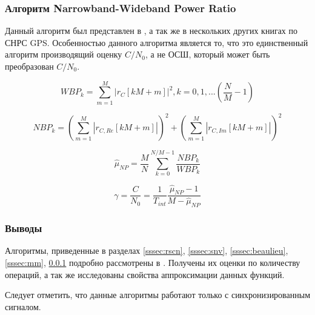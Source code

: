 \subsubsection{Алгоритм Narrowband-Wideband Power Ratio}
\label{sssec:nwpr}

Данный алгоритм был представлен в \cite{parkinson_1996}, а так же в нескольких других книгах по СНРС GPS. Особенностью данного алгоритма
является то, что это единственный алгоритм производящий оценку ${C/N_0}$, а не ОСШ, который может быть преобразован ${C/N_0}$.

\begin{center}
\begin{equation}
	WBP_k = \sum \limits_{m=1}^{M} \left|r_C[kM+m] \right| ^2, k=0,1,...(\frac{N}{M}-1)
\end{equation}
\end{center}

\begin{center}
\begin{equation}
	NBP_k = (\sum \limits_{m=1}^{M} \left|r_{C,Re}[kM+m] \right| )^2 + (\sum \limits_{m=1}^{M} \left|r_{C,Im}[kM+m] \right| )^2
\end{equation}
\end{center}

\begin{center}
\begin{equation}
	\hat \mu_{NP} = \frac{M}{N} \sum \limits_{k=0}^{N/M-1} \frac{NBP_k}{WBP_k}
\end{equation}
\end{center}

\begin{center}
\begin{equation}
	\gamma = \frac{C}{N_0} = \frac{1}{T_{int}} \frac{\hat \mu_{NP} - 1}{M - \hat \mu_{NP}}
\end{equation}
\end{center}

\subsubsection{Выводы}
Алгоритмы, приведенные в разделах \ref{sssec:rscn}, \ref{sssec:snv}, \ref{sssec:beaulieu}, \ref{sssec:mm}, \ref{sssec:nwpr}
подробно рассмотрены в \cite{presti_ieee}. Получены их оценки по количеству операций, а так же
исследованы свойства аппроксимации данных функций.

Следует отметить, что данные алгоритмы работают только с синхронизированным сигналом.

\newpage
